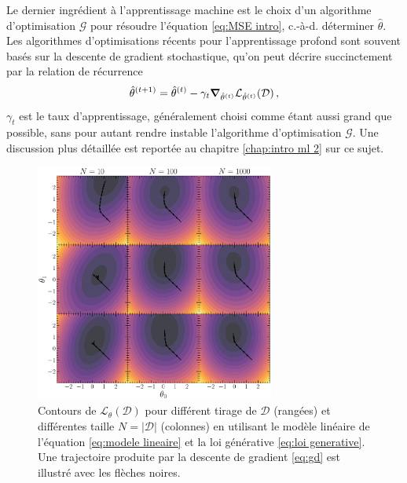 Le dernier ingrédient à l'apprentissage machine est le choix d'un algorithme d'optimisation $\mathcal{G}$ pour résoudre l'équation \eqref{eq:MSE intro}, c.-à-d. déterminer 
$\hat{\theta}$. Les algorithmes d'optimisations récents pour l'apprentissage profond sont souvent basés sur la descente de gradient stochastique, qu'on peut décrire succinctement 
par la relation de récurrence
\begin{equation}\label{eq:gd}
        \hat{\theta}^{(t+1)} = \hat{\theta}^{(t)} - \gamma_t \grad_{\hat{\theta}^{(t)}} \mathcal{L}_{\hat{\theta}^{(t)}}(\mathcal{D})\, ,
\end{equation} 
$\gamma_t$ est le taux d'apprentissage, généralement choisi comme étant aussi grand que possible, 
sans pour autant rendre instable l'algorithme d'optimisation $\mathcal{G}$. Une discussion plus détaillée est reportée au chapitre \ref{chap:intro ml 2} sur ce sujet.

\begin{figure}[th!]
        \centering
        \includegraphics[width=0.7\textwidth]{notebooks/monte_carlo_loss.pdf}
        \caption{Contours de $\mathcal{L}_\theta(\mathcal{D})$ pour différent tirage de $\mathcal{D}$ (rangées) et différentes taille $N = |\mathcal{D}|$ (colonnes) 
                en utilisant le modèle linéaire de l'équation \eqref{eq:modele lineaire} et la loi générative \eqref{eq:loi generative}.
        Une trajectoire produite par la descente de gradient \eqref{eq:gd} est illustré avec les flèches noires.}
        \label{fig:monte carlo L}
\end{figure}

